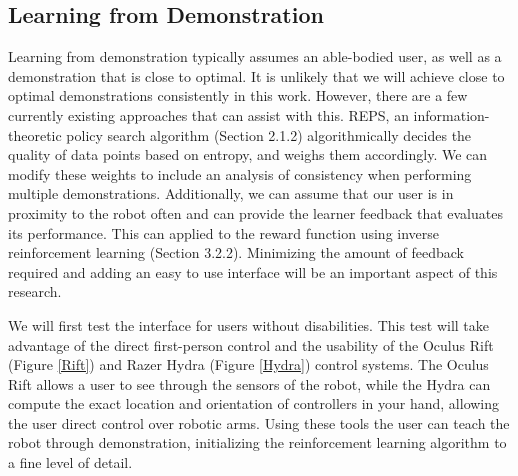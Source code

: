 \documentclass{article}
\begin{document}
\subsection{Learning from Demonstration}


Learning from demonstration typically assumes an able-bodied user, as well as a demonstration that is close to optimal. It is unlikely that we will achieve close to optimal demonstrations consistently in this work. However, there are a few currently existing approaches that can assist with this. REPS, an information-theoretic policy search algorithm (Section 2.1.2) algorithmically decides the quality of data points based on entropy, and weighs them accordingly. We can modify these weights to include an analysis of consistency when performing multiple demonstrations. Additionally, we can assume that our user is in proximity to the robot often and can provide the learner feedback that evaluates its performance. This can applied to the reward function using inverse reinforcement learning (Section 3.2.2). Minimizing the amount of feedback required and adding an easy to use interface will be an important aspect of this research. 


We will first test the interface for users without disabilities. This test will take advantage of the direct first-person control and the usability of the Oculus Rift (Figure \ref{Rift}) and Razer Hydra (Figure \ref{Hydra}) control systems. The Oculus Rift allows a user to see through the sensors of the robot, while the Hydra can compute the exact location and orientation of controllers in your hand, allowing the user direct control over robotic arms. Using these tools the user can teach the robot through demonstration, initializing the reinforcement learning algorithm to a fine level of detail.
\end{document}

